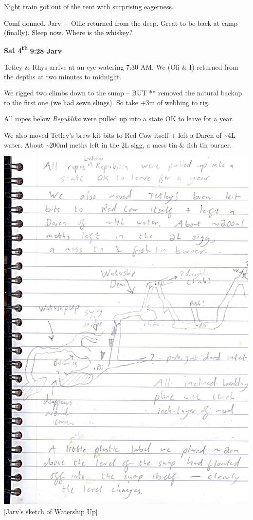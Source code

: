 Night train got out of the tent with surprising eagerness.

Comf donned, Jarv + Ollie returned from the deep. Great to be back at
camp (finally). Sleep now. Where is the whiskey?

\textbf{Sat 4\textsuperscript{th}} \textbf{9:28 Jarv}

Tetley \& Rhys arrive at an eye-watering 7:30 AM. We (Oli \& I) returned
from the depths at two minutes to midnight.

We rigged two climbs down to the sump -- BUT ** removed the natural
backup to the first one (we had sewn slings). So take +3m of webbing to
rig.

All ropes below \emph{Republika} were pulled up into a state OK to leave
for a year.

We also moved Tetley's brew kit bits to Red Cow itself + left a Daren of
\textasciitilde{}4L water. About \textasciitilde{}200ml meths left in
the 2L sigg, a mess tin \& fish tin burner.

\includegraphics{UgLog1012/86.jpeg}\\
{[}Jarv's sketch of Watership Up{]}

